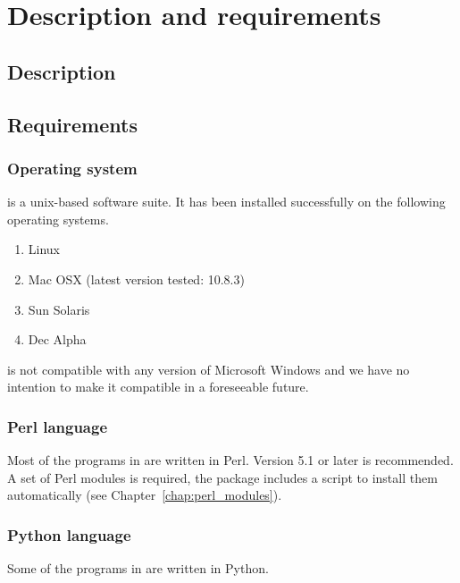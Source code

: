 \documentclass[12pt,a4paper, oneside]{scrreprt} %
\begin{document}
\chapter{Description and requirements}

\section{Description}


\section{Requirements}

\subsection{Operating system}

\RSAT is a unix-based software suite. It has been installed
successfully on the following operating systems.

\begin{enumerate}
\item Linux

\item Mac OSX (latest version tested: 10.8.3)

\item Sun Solaris

\item Dec Alpha

\end{enumerate}

\RSAT is not compatible with any version of Microsoft Windows and we
have no intention to make it compatible in a foreseeable future.

\subsection{Perl language}

Most of the programs in \RSAT are written in Perl. Version 5.1 or
later is recommended. A set of Perl modules is required, the \RSAT
package includes a script to install them automatically (see
Chapter~\ref{chap:perl_modules}).

\subsection{Python language}

Some of the programs in \RSAT are written in Python. 
\end{document}
